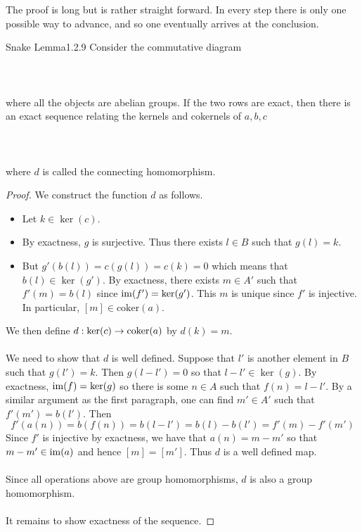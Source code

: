 \documentclass[a4paper]{article}
\begin{document}
The proof is long but is rather straight forward. In every step there is only one possible way to advance, and so one eventually arrives at the conclusion. 

\begin{lmm}{Snake Lemma}{1.2.9} Consider the commutative diagram \\~\\
\\~\\
where all the objects are abelian groups. If the two rows are exact, then there is an exact sequence relating the kernels and cokernels of $a,b,c$ \\~\\
\\~\\
where $d$ is called the connecting homomorphism. \tcbline
\begin{proof}
We construct the function $d$ as follows. 
\begin{itemize}
\item Let $k\in\ker(c)$. 
\item By exactness, $g$ is surjective. Thus there exists $l\in B$ such that $g(l)=k$. 
\item But $g'(b(l))=c(g(l))=c(k)=0$ which means that $b(l)\in\ker(g')$. By exactness, there exists $m\in A'$ such that $f'(m)=b(l)$ since $\operatorname{im}(f')=\ker(g')$. This $m$ is unique since $f'$ is injective. In particular, $[m]\in\text{coker}(a)$. 
\end{itemize}
We then define $d:\ker(c)\to\operatorname{coker}(a)$ by $d(k)=m$. \\~\\

We need to show that $d$ is well defined. Suppose that $l'$ is another element in $B$ such that $g(l')=k$. Then $g(l-l')=0$ so that $l-l'\in\ker(g)$. By exactness, $\operatorname{im}(f)=\ker(g)$ so there is some $n\in A$ such that $f(n)=l-l'$. By a similar argument as the first paragraph, one can find $m'\in A'$ such that $f'(m')=b(l')$. Then $$f'(a(n))=b(f(n))=b(l-l')=b(l)-b(l')=f'(m)-f'(m')$$ Since $f'$ is injective by exactness, we have that $a(n)=m-m'$ so that $m-m'\in\operatorname{im}(a)$ and hence $[m]=[m']$. Thus $d$ is a well defined map. \\~\\

Since all operations above are group homomorphisms, $d$ is also a group homomorphism. \\~\\

It remains to show exactness of the sequence. 
\end{proof}
\end{lmm}
\end{document}
